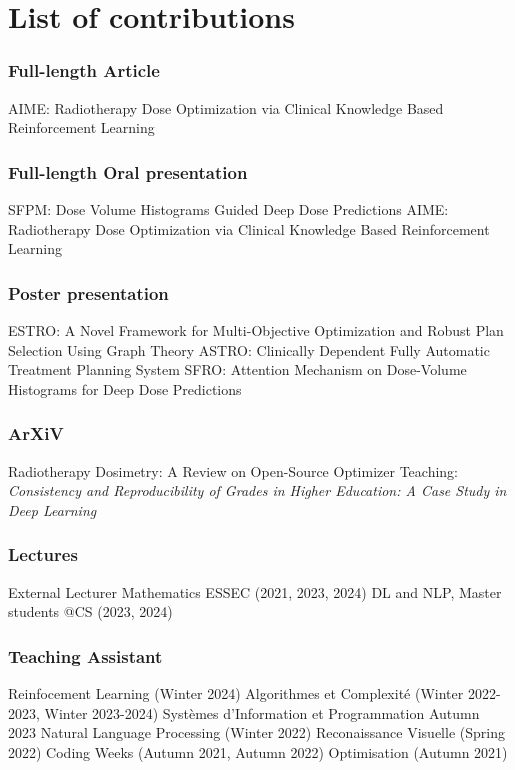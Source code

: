 \chapter*{List of contributions}
\subsection*{Full-length Article}
AIME: Radiotherapy Dose Optimization via Clinical Knowledge Based Reinforcement Learning

\subsection*{Full-length Oral presentation}
SFPM: Dose Volume Histograms Guided Deep Dose Predictions
AIME: Radiotherapy Dose Optimization via Clinical Knowledge Based Reinforcement Learning

\subsection*{Poster presentation}
ESTRO: A Novel Framework for Multi-Objective Optimization and Robust Plan Selection Using Graph Theory
ASTRO: Clinically Dependent Fully Automatic Treatment Planning System
SFRO: Attention Mechanism on Dose-Volume Histograms for Deep Dose Predictions

\subsection*{ArXiV}
Radiotherapy Dosimetry: A Review on Open-Source Optimizer
Teaching: \textit{Consistency and Reproducibility of Grades in Higher Education: A Case Study in Deep Learning}

\subsection*{Lectures}
External Lecturer Mathematics ESSEC (2021, 2023, 2024)
DL and NLP, Master students @CS (2023, 2024)

\subsection*{Teaching Assistant}
Reinfocement Learning (Winter 2024)
Algorithmes et Complexité (Winter 2022-2023, Winter 2023-2024)
Systèmes d'Information et Programmation Autumn 2023
Natural Language Processing (Winter 2022)
Reconaissance Visuelle (Spring 2022)
Coding Weeks (Autumn 2021, Autumn 2022)
Optimisation (Autumn 2021)

